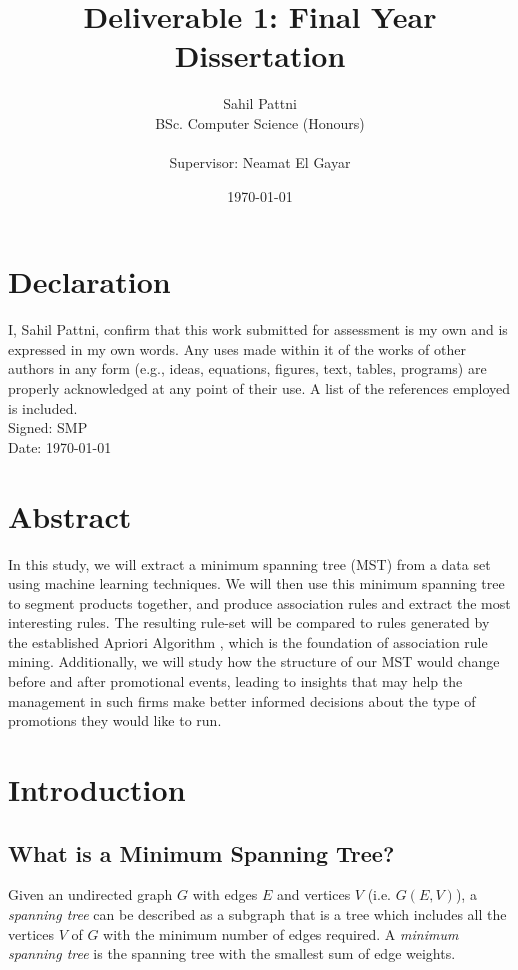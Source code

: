 \documentclass[a4paper,11pt]{article}
\newcommand{\pcite}{\parencite}
\begin{document}
\title{Deliverable 1: Final Year Dissertation}
\author{
	Sahil Pattni\\ 
	BSc. Computer Science (Honours)\\\\
	Supervisor: Neamat El Gayar
	}
\date{\today}
\maketitle
{}
\newpage
\section*{Declaration}
I, Sahil Pattni, confirm that this work submitted for assessment is my own and is expressed in my own words. Any uses made within it of the works of other authors in any form (e.g., ideas, equations, figures, text, tables, programs) are properly acknowledged at any point of their use. A list of the references employed is included. 
\\
Signed: SMP\\
Date: \today


\section*{Abstract}
In this study, we will extract a minimum spanning tree (MST) from a data set using machine learning techniques. We will then use this minimum spanning tree to segment products together,  and produce association rules and extract the most interesting rules. The resulting rule-set will be compared to rules generated by the established Apriori Algorithm \pcite{apriori}, which is the foundation of association rule mining.  Additionally, we will study how the structure of our MST would change before and after promotional events, leading to insights that may help the management in such firms make better informed decisions about the type of promotions they would like to run.


\tableofcontents
\newpage

\section{Introduction}
\subsection{What is a Minimum Spanning Tree?}
Given an undirected graph $G$ with edges $E$ and vertices $V$ (i.e. $G(E,V)$), a \textit{spanning tree} can be described as a subgraph that is a tree \pcite{tree} which includes all the vertices $V$ of $G$ with the minimum number of edges required. A \textit{minimum spanning tree} is the spanning tree with the smallest sum of edge weights.
\end{document}
